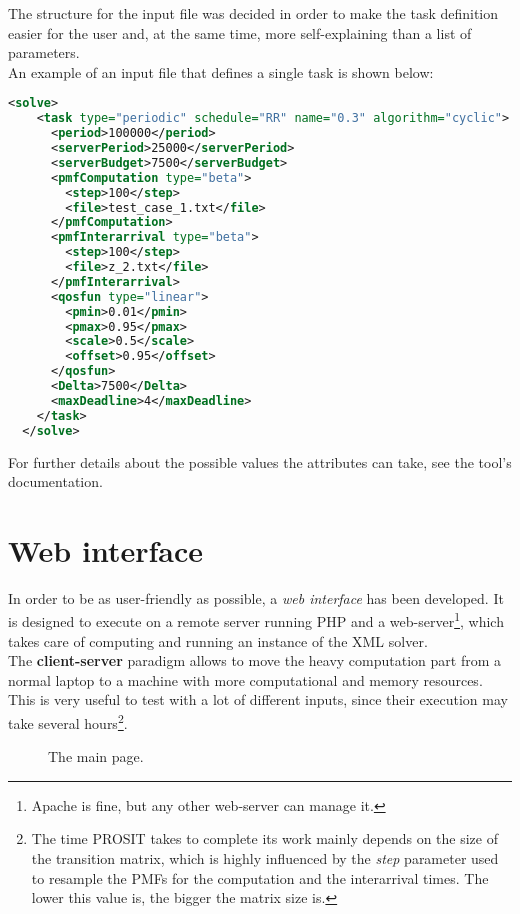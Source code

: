 The structure for the input file was decided in order to make the task definition easier for the user and, at the same time, more self-explaining than a list of parameters.\\
An example of an input file that defines a single task is shown below:
\begin{lstlisting}[frame=bt, language=XML, numbers=none]
  <solve>
    <task type="periodic" schedule="RR" name="0.3" algorithm="cyclic">
      <period>100000</period>
      <serverPeriod>25000</serverPeriod>
      <serverBudget>7500</serverBudget>
      <pmfComputation type="beta">
        <step>100</step>
        <file>test_case_1.txt</file>
      </pmfComputation>
      <pmfInterarrival type="beta">
        <step>100</step>
        <file>z_2.txt</file>
      </pmfInterarrival>
      <qosfun type="linear">
        <pmin>0.01</pmin>
        <pmax>0.95</pmax>
        <scale>0.5</scale>
        <offset>0.95</offset>
      </qosfun>
      <Delta>7500</Delta>
      <maxDeadline>4</maxDeadline>
    </task>
  </solve>
\end{lstlisting}

For further details about the possible values the attributes can take, see the tool's documentation.  

\section{Web interface}
In order to be as user-friendly as possible, a \emph{web interface} has been developed. It is designed to execute on a remote server running PHP and a web-server\footnote{Apache is fine, but any other web-server can manage it.}, which takes care of computing and running an instance of the XML solver.\\
The \textbf{client-server} paradigm allows to move the heavy computation part from a normal laptop to a machine with more computational and memory resources. This is very useful to test with a lot of different inputs, since their execution may take several hours\footnote{The time PROSIT takes to complete its work mainly depends on the size of the transition matrix, which is highly influenced by the \emph{step} parameter used to resample the PMFs for the computation and the interarrival times. The lower this value is, the bigger the matrix size is.}.
\begin{figure}[H]
  \caption{The main page.}
  \label{index}
\end{figure}

